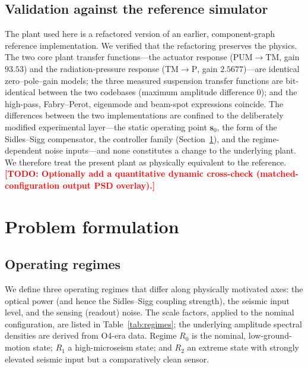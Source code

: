 \documentclass[11pt,a4paper]{article}
\newcommand{\todo}[1]{\textcolor{red}{\textbf{[TODO: #1]}}}
\begin{document}
\subsection{Validation against the reference simulator}\label{sec:fw-valid}
The plant used here is a refactored version of an earlier, component-graph
reference implementation. We verified that the refactoring preserves the
physics. The two core plant transfer functions---the actuator response
($\mathrm{PUM}{\to}\mathrm{TM}$, gain $93.53$) and the radiation-pressure
response ($\mathrm{TM}{\to}\mathrm{P}$, gain $2.5677$)---are identical
zero--pole--gain models; the three measured suspension transfer functions are
bit-identical between the two codebases (maximum amplitude difference $0$); and
the high-pass, Fabry--Perot, eigenmode and beam-spot expressions coincide. The
differences between the two implementations are confined to the deliberately
modified experimental layer---the static operating point $\mathbf{s}_0$, the
form of the Sidles--Sigg compensator, the controller family
(Section~\ref{sec:problem}), and the regime-dependent noise inputs---and none
constitutes a change to the underlying plant. We therefore treat the present
plant as physically equivalent to the reference. \todo{Optionally add a
quantitative dynamic cross-check (matched-configuration output PSD overlay).}

\section{Problem formulation}\label{sec:problem}
\subsection{Operating regimes}\label{sec:pr-regimes}
We define three operating regimes that differ along physically motivated axes:
the optical power (and hence the Sidles--Sigg coupling strength), the seismic
input level, and the sensing (readout) noise. The scale factors, applied to the
nominal configuration, are listed in Table~\ref{tab:regimes}; the underlying
amplitude spectral densities are derived from O4-era data. Regime $R_0$ is the
nominal, low-ground-motion state; $R_1$ a high-microseism state; and $R_2$ an
extreme state with strongly elevated seismic input but a comparatively clean
sensor.
\end{document}
